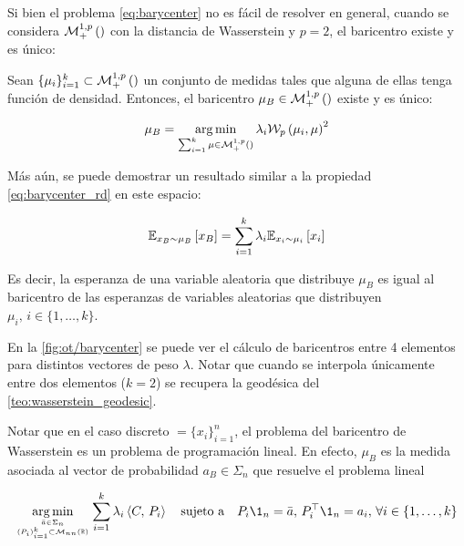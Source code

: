 Si bien el problema \eqref{eq:barycenter} no es fácil de resolver en general, cuando se considera $\mathcal{M}_+^{1,p}\left(\right)$ con la distancia de Wasserstein y $p=2$, el baricentro existe y es único:

\begin{prop}
	Sean $\{\mu_i\}_{i=1}^k\subset\mathcal{M}_+^{1,p}\left(\right)$ un conjunto de medidas tales que alguna de ellas tenga función de densidad. Entonces, el baricentro $\mu_B\in\mathcal{M}_+^{1,p}\left(\right)$ existe y es único:

	\begin{equation*}
		\mu_B = \operatorname*{arg\,min}_{\sum_{i=1}^k \mu\in\mathcal{M}_+^{1,p}\left(\right)} \lambda_i \mathcal{W}_{p}\left(\mu_i,\mu\right)^2
	\end{equation*}
	
	
	Más aún, se puede demostrar un resultado similar a la propiedad \eqref{eq:barycenter_rd} en este espacio:

\begin{equation*}
	\mathbb{E}_{x_B\sim\mu_B}\left[x_B\right] = \sum_{i=1}^k \lambda_i \mathbb{E}_{x_i\sim\mu_i}\left[x_i\right]
\end{equation*}

	Es decir, la esperanza de una variable aleatoria que distribuye $\mu_B$ es igual al baricentro de las esperanzas de variables aleatorias que distribuyen $\mu_i,\, i\in\{1,\ldots,k\}$.
\end{prop}

En la \autoref{fig:ot/barycenter} se puede ver el cálculo de baricentros entre 4 elementos para distintos vectores de peso $\lambda$. Notar que cuando se interpola únicamente entre dos elementos ($k=2$) se recupera la geodésica del \autoref{teo:wasserstein_geodesic}.


Notar que en el caso discreto $\xspace=\{x_i\}_{i=1}^n$, el problema del baricentro de Wasserstein es un problema de programación lineal. En efecto, $\mu_B$ es la medida asociada al vector de probabilidad $a_B\in\Sigma_n$ que resuelve el problema lineal

\begin{equation}
	\label{eq:discrete_barycenter}
	\argmin_{\feasible{\bar a\in\Sigma_n}{(P_i)_{i=1}^k\subset \matrixspace{nn}{\R}}}
	\sum_{i=1}^k \lambda_i\dotproduct{C}{P_i}
	\quad\text{sujeto a}\quad
	P_i\1_n = \bar a,\, P_i^\top \1_n = a_i,\,\forall i\in\{1,\ldots,k\}
\end{equation}

